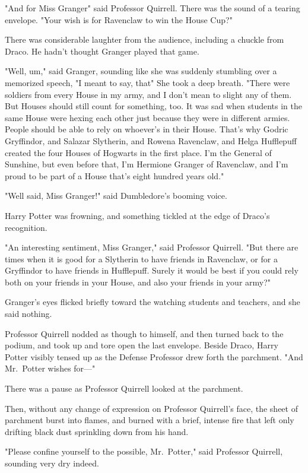 "And for Miss Granger{\el}" said Professor Quirrell. There was the sound of
a tearing envelope. "Your wish is for{\el} Ravenclaw to win the House Cup?"

There was considerable laughter from the audience, including a chuckle from
Draco. He hadn't thought Granger played that game.

"Well, um," said Granger, sounding like she was suddenly stumbling over a
memorized speech, "I meant to say, that{\el}" She took a deep breath. "There
were soldiers from every House in my army, and I don't mean to slight any of
them. But Houses should still count for something, too. It was sad when
students in the same House were hexing each other just because they were in
different armies. People should be able to rely on whoever's in their House.
That's why Godric Gryffindor, and Salazar Slytherin, and Rowena Ravenclaw, and
Helga Hufflepuff created the four Houses of Hogwarts in the first place. I'm
the General of Sunshine, but even before that, I'm Hermione Granger of
Ravenclaw, and I'm proud to be part of a House that's eight hundred years old."

"Well said, Miss Granger!" said Dumbledore's booming voice.

Harry Potter was frowning, and something tickled at the edge of Draco's
recognition.

"An interesting sentiment, Miss Granger," said Professor Quirrell. "But there
are times when it is good for a Slytherin to have friends in Ravenclaw, or for
a Gryffindor to have friends in Hufflepuff. Surely it would be best if you
could rely both on your friends in your House, and also your friends in your
army?"

Granger's eyes flicked briefly toward the watching students and teachers, and
she said nothing.

Professor Quirrell nodded as though to himself, and then turned back to the
podium, and took up and tore open the last envelope. Beside Draco, Harry Potter
visibly tensed up as the Defense Professor drew forth the parchment. "And
Mr.~Potter wishes for\mbox{---}"

There was a pause as Professor Quirrell looked at the parchment.

Then, without any change of expression on Professor Quirrell's face, the sheet
of parchment burst into flames, and burned with a brief, intense fire that left
only drifting black dust sprinkling down from his hand.

"Please confine yourself to the possible, Mr.~Potter," said Professor Quirrell,
sounding very dry indeed.

